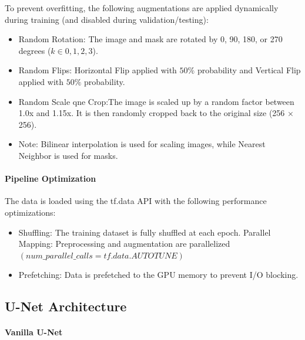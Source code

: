 To prevent overfitting, the following augmentations are applied dynamically during training (and disabled during validation/testing):

\begin{itemize}
    \item Random Rotation: The image and mask are rotated by 0, 90, 180, or 270 degrees ($k \in {0, 1, 2, 3}$).
    \item Random Flips: Horizontal Flip applied with $50\%$ probability and Vertical Flip applied with $50\%$ probability.
    \item Random Scale qne Crop:The image is scaled up by a random factor between 1.0x and 1.15x. It is then randomly cropped back to the original size (256 $\times$ 256).
    \item Note: Bilinear interpolation is used for scaling images, while Nearest Neighbor is used for masks.
\end{itemize}

\paragraph{Pipeline Optimization}

The data is loaded using the tf.data API with the following performance optimizations:
\begin{itemize}
    \item Shuffling: The training dataset is fully shuffled at each epoch.
    Parallel Mapping: Preprocessing and augmentation are parallelized $(num\_parallel\_calls=tf.data.AUTOTUNE)$
    \item Prefetching: Data is prefetched to the GPU memory to prevent I/O blocking.
\end{itemize}



\subsection{U-Net Architecture}

\paragraph{Vanilla U-Net}

